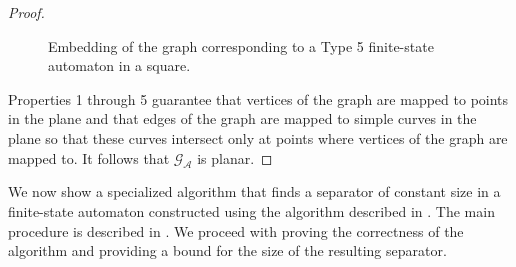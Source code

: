 \begin{proof}
\begin{case}[$\mathcal{E} = \mathcal{E}'*$ where $\mathcal{E}'$ is a regular
    expression]
    \begin{figure}[!h]
      \centering
      \caption{Embedding of the graph corresponding to a Type 5 finite-state
      automaton in a square.}
      \label{fig:f_thompson_5}
    \end{figure}
  \end{case}

  Properties 1 through 5 guarantee that vertices of the graph are mapped to
  points in the plane and that edges of the graph are mapped to simple curves
  in the plane so that these curves intersect only at points where vertices
  of the graph are mapped to. It follows that $\mathcal{G}_{\mathcal{A}}$ is
  planar.
\end{proof}

We now show a specialized algorithm that finds a separator of constant size in a
finite-state automaton constructed using the algorithm described in
. The main procedure is described in
. We proceed with proving the correctness of the
algorithm and providing a bound for the size of the resulting separator.

